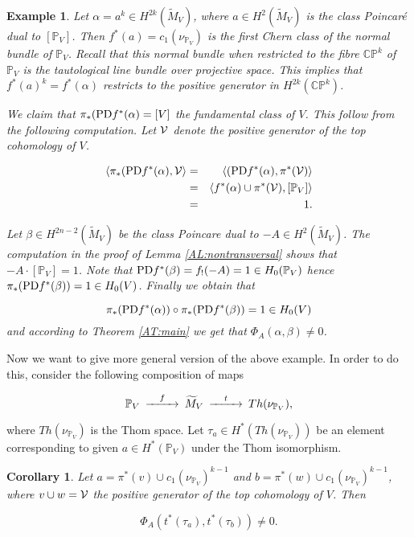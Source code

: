 \documentclass[a4paper,14pt]{article}
\newcommand{\B}[1]{\mathbb #1}
\newcommand{\C}[1]{{\cal #1}}
\newcommand{\al}{{\alpha}}
\newcommand{\be}{{\beta}}
\newcommand{\qed}{\rightline {$\Box $}}
\newcommand{\blowMV}{\widetilde {M}_V}
\newcommand{\cp}{{\B C\B P}}
\newcommand{\PD }{\hbox {\text {PD}}}
\newcommand{\BS}{{\bigskip}}
\newcommand{\NI}{{\noindent}}
\newtheorem{cor}[theorem]{Corollary}
\newtheorem{ex}[theorem]{Example}
\numberwithin{equation}{section}
\begin{document}
\qed

\BS




\begin{ex}
{\em
Let $\al = a^k\in H^{2k}(\blowMV )$, where $a \in H^2(\blowMV)$ is the
class Poincar\' e dual to $[\B P_V]$. Then
$f^*(a)= c_1(\nu _{\B P_V})$ is the first Chern class of the normal
bundle of $\B P_V$.
Recall that this normal bundle when restricted to the fibre
$\cp^k$ of $\B P_V$ is the tautological line bundle
over projective space.
This implies that $f^*(a)^k = f^*(\al )$ restricts
to the positive generator in $H^{2k}(\cp ^k)$.

We claim that $\pi _*(\PD f^*(\al ) = [V]$ the fundamental
class of $V$. This follow from the following computation.
Let $\C V$ denote the positive
generator of the top cohomology of $V$.

\begin{eqnarray*}
\left <\pi _*(\PD f^*(\al ), \C V \right > &=&
\left <(\PD f^*(\al ),\pi ^* (\C V )\right >\\
&=& \left <f^*(\al )\cup \pi^*(\C V), [\B P_V] \right >\\
&=& 1.
\end{eqnarray*}


Let $\be \in H^{2n - 2}(\blowMV)$ be the class Poincare
dual to $-A\in H^2(\blowMV)$. The computation in the proof
of Lemma \ref{AL:nontransversal} shows that
$-A \cdot [\B P_V] = 1$. Note that
$\PD f^*(\be ) = f_!(-A) = 1 \in H_0(\B P_V)$ hence
$\pi _*(\PD f^*(\be )) = 1 \in H_0(V)$.
Finally we obtain that

$$\pi _*(\PD f^*(\al )) \circ \pi _*(\PD f^*(\be )) = 1 \in H_0(V)$$
and according to Theorem \ref{AT:main} we get that
$\Phi _A(\al,\be) \neq 0$.
}
\end{ex}





Now we want to give more general version of the
above example. In order to do this,
consider the following composition of maps

$$
\begin{CD}
\B P_V @>f>> \blowMV @>t>>       Th(\nu _{\B P_V}),
\end{CD}
$$

\NI
where $Th(\nu_{\B P_V})$ is the Thom space.
Let $\tau _{a } \in H^*(Th(\nu _{\B P_V}))$ be an element
corresponding to given
$a\in H^*(\B P_V)$ under the Thom isomorphism.




\begin{cor}\label{AC:main}
Let $a = \pi ^*(v) \cup c_1(\nu _{\B P_V}) ^{k-1}$ and
$b=\pi ^*(w) \cup c_1(\nu _{\B P_V}) ^{k-1}$, where
$v \cup w = \C V$ the positive generator of the top cohomology
of $V$. Then

$$\Phi _A (t^*(\tau _a),t^*(\tau _b)) \neq 0.$$
\end{cor}
\end{document}
